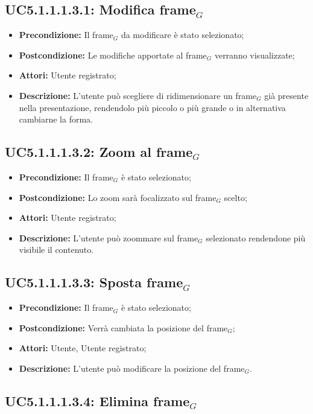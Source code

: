 \subsection{ UC5.1.1.1.3.1: Modifica frame$_G$}

\begin{itemize}
	\item \textbf{Precondizione:} Il frame$_G$ da modificare è stato selezionato;
	\item \textbf{Postcondizione:} Le modifiche apportate al frame$_G$ verranno visualizzate;
	\item \textbf{Attori:} Utente registrato;
	\item \textbf{Descrizione:} L'utente può scegliere di ridimensionare un frame$_G$ già presente nella presentazione, rendendolo più piccolo o più grande o in alternativa cambiarne la forma.
\end{itemize}
\subsection{ UC5.1.1.1.3.2: Zoom al frame$_G$}

\begin{itemize}
	\item \textbf{Precondizione:} Il frame$_G$ è stato selezionato;
	\item \textbf{Postcondizione:} Lo zoom sarà focalizzato sul frame$_G$ scelto;
	\item \textbf{Attori:} Utente registrato;
	\item \textbf{Descrizione:} L'utente può zoommare sul frame$_G$ selezionato rendendone più visibile il contenuto.
\end{itemize}
\subsection{ UC5.1.1.1.3.3: Sposta frame$_G$}

\begin{itemize}
	\item \textbf{Precondizione:} Il frame$_G$ è stato selezionato;
	\item \textbf{Postcondizione:} Verrà cambiata la posizione del frame$_G$;
	\item \textbf{Attori:} Utente, Utente registrato;
	\item \textbf{Descrizione:} L'utente può modificare la posizione del frame$_G$.
\end{itemize}
\subsection{ UC5.1.1.1.3.4: Elimina frame$_G$}

